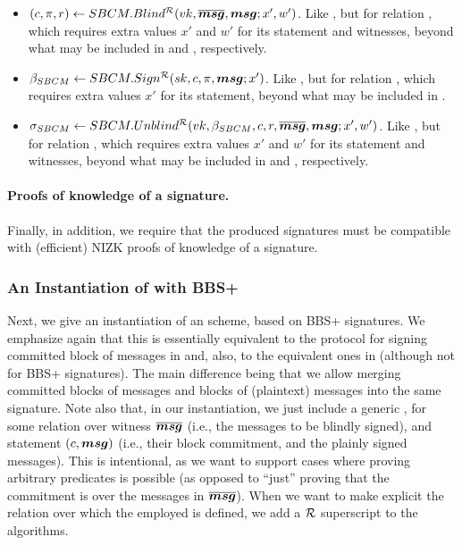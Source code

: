 \begin{itemize}
\item $(c,\pi,r) \gets SBCM.Blind^\mathcal{R}(vk,\overline{\boldsymbol{msg}},\boldsymbol{msg};x',w')$. Like
  \SBCMBlind, but for relation \NIZKRel, which requires extra values $x'$ and
  $w'$ for its statement and witnesses, beyond what may be included in \smsg and
  \osmsg, respectively.
\item $\beta_{SBCM} \gets SBCM.Sign^\mathcal{R}(sk,c,\pi,\boldsymbol{msg};x')$. Like
  \SBCMSign, but for relation \NIZKRel, which requires extra values $x'$
  for its statement, beyond what may be included in \smsg.
\item $\sigma_{SBCM} \gets SBCM.Unblind^\mathcal{R}(vk,\beta_{SBCM},c,r,\overline{\boldsymbol{msg}},\boldsymbol{msg};
  x',w')$. Like \SBCMUnblind, but for relation \NIZKRel, which requires extra
  values $x'$ and $w'$ for its statement and witnesses, beyond what may be
  included in \smsg and \osmsg, respectively.
\end{itemize}

\paragraph{Proofs of knowledge of a \SBCM signature.} %
Finally, in addition, we require that the produced signatures must be compatible
with (efficient) NIZK proofs of knowledge of a signature.

\subsubsection{An Instantiation of \SBCM with BBS+}

Next, we give an instantiation of an \SBCM scheme, based on BBS+ signatures.
We emphasize again that this is essentially equivalent to the protocol for
signing committed block of messages in \cite{asm06} and, also, to the equivalent
ones in \cite{cl02,ps16} (although not for BBS+ signatures). The main difference
being that we allow merging committed blocks of messages and blocks of
(plaintext) messages into the same signature.
%
Note also that, in our instantiation, we just include a generic \NIZK, for some
relation over witness $\overline{\boldsymbol{msg}}$ (i.e., the messages to be blindly
signed), and statement $(c,\boldsymbol{msg})$ (i.e., their block commitment, and the
plainly signed messages). This is intentional, as we want to support cases where
proving arbitrary predicates is possible (as opposed to ``just'' proving that
the commitment is over the messages in $\overline{\boldsymbol{msg}}$).
%
When we want to make explicit the relation over which the employed \NIZK is
defined, we add a $\mathcal{R}$ superscript to the algorithms.

